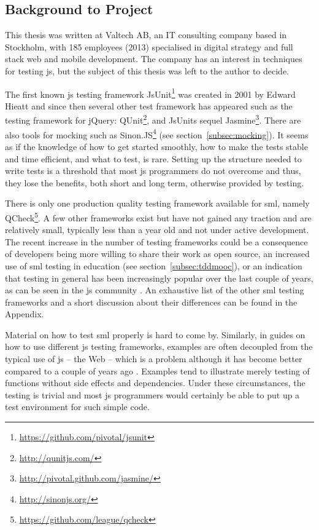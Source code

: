 \documentclass[11pt]{article}
\begin{document}
\subsection{Background to Project}
\label{mltestingframeworks}

This thesis was written at Valtech AB, an IT consulting company based in Stockholm, with 185 employees (2013) specialised in digital strategy and full stack web and mobile development. The company has an interest in techniques for testing \gls{js}, but the subject of this thesis was left to the author to decide.

The first known \gls{js} testing framework JsUnit\footnote{\url{https://github.com/pivotal/jsunit}} was created in 2001 by Edward Hieatt \cite{GoingFaster} and since then several other test framework has appeared such as the testing framework for jQuery: QUnit\footnote{\url{http://qunitjs.com/}}, and JsUnits sequel Jasmine\footnote{\url{http://pivotal.github.com/jasmine/}}. There are also tools for mocking such as Sinon.JS\footnote{\url{http://sinonjs.org/}} (see section~\ref{subsec:mocking}). It seems as if the knowledge of how to get started smoothly, how to make the tests stable and time efficient, and what to test, is rare. Setting up the structure needed to write tests is a threshold that most \gls{js} programmers do not overcome \cite{TestingStatistics} and thus, they lose the benefits, both short and long term, otherwise provided by testing.

There is only one production quality testing framework available for \gls{sml}, namely QCheck\footnote{\url{https://github.com/league/qcheck}}. A few other frameworks exist but have not gained any traction and are relatively small, typically less than a year old and not under active development. The recent increase in the number of testing frameworks could be a consequence of developers being more willing to share their work as open source, an increased use of \gls{sml} testing in education (see section~\ref{subsec:tddmooc}), or an indication that testing in general has been increasingly popular over the last couple of years, as can be seen in the \gls{js} community \cite[question~1]{Edelstam}. An exhaustive list of the other \gls{sml} testing frameworks and a short discussion about their differences can be found in the Appendix.

Material on how to test \gls{sml} properly is hard to come by. Similarly, in guides on how to use different \gls{js} testing frameworks, examples are often decoupled from the typical use of \gls{js} -- the Web -- which is a problem \cite[question~3]{Ekelof} although it has become better compared to a couple of years ago \cite[question~27]{Ahnve}. Examples tend to illustrate merely testing of functions without side effects and dependencies. Under these circumstances, the testing is trivial and most \gls{js} programmers would certainly be able to put up a test environment for such simple code.
\end{document}
